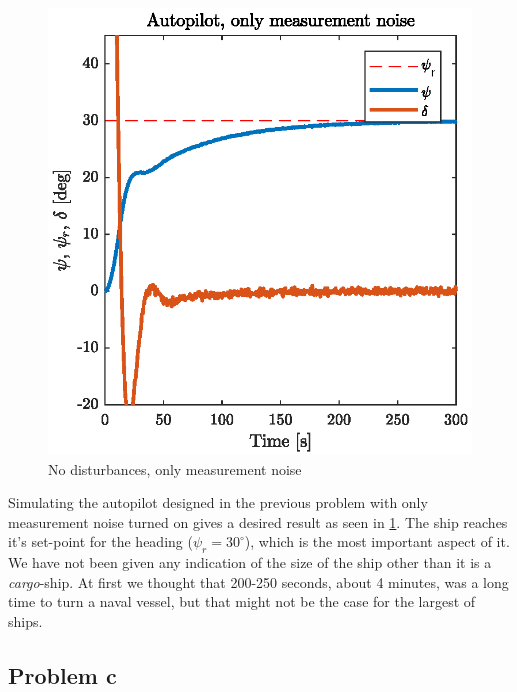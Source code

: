 \begin{figure}[h]
	\centering
	\includegraphics[width=\textwidth]{figures/p5p3b.eps}
	\caption{No disturbances, only measurement noise}
\label{fig:p5p3b_only_noise}
\end{figure}

Simulating the autopilot designed in the previous problem with only measurement noise turned on gives a desired result as seen in \cref{fig:p5p3b_only_noise}. The ship reaches it's set-point for the heading ($\psi_r = 30^\circ$), which is the most important aspect of it. We have not been given any indication of the size of the ship other than it is a \textit{cargo}-ship. At first we thought that 200-250 seconds, about 4 minutes, was a long time to turn a naval vessel, but that might not be the case for the largest of ships.



\subsection{Problem c} \label{sec:Autopilot_c}

